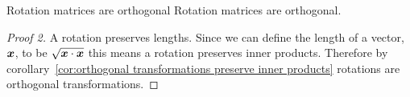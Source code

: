 \documentclass[a4paper]{article}
\begin{document}
    \begin{theorem}{Rotation matrices are orthogonal}{}
        Rotation matrices are orthogonal.
    \end{theorem}
    \begin{proof}[Proof 2]
        A rotation preserves lengths.
        Since we can define the length of a vector, \(\bm{x}\), to be \(\sqrt{\bm{x}\cdot\bm{x}}\) this means a rotation preserves inner products.
        Therefore by corollary~\ref{cor:orthogonal transformations preserve inner products} rotations are orthogonal transformations.
    \end{proof}
    
\end{document}
